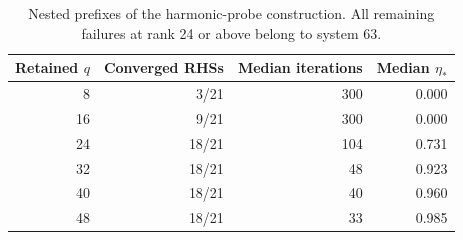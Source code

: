 \begin{table}[htbp]
\centering
\caption{Nested prefixes of the harmonic-probe construction. All remaining failures at rank 24 or above belong to system 63.}
\label{tab:probe-rank}
\begin{tabular}{rrrr}
\toprule
Retained $q$ & Converged RHSs & Median iterations & Median $\eta_*$\\
\midrule
8 & 3/21 & 300 & 0.000\\
16 & 9/21 & 300 & 0.000\\
24 & 18/21 & 104 & 0.731\\
32 & 18/21 & 48 & 0.923\\
40 & 18/21 & 40 & 0.960\\
48 & 18/21 & 33 & 0.985\\
\bottomrule
\end{tabular}
\end{table}
